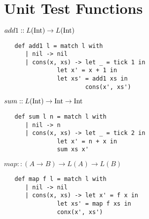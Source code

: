 \chapter{Unit Test Functions}

\(add1 :: L(\text{Int}) \to L(\text{Int})\)
\begin{verbatim}
   def add1 l = match l with 
      | nil -> nil
      | cons(x, xs) -> let _ = tick 1 in 
		       let x' = x + 1 in
		       let xs' = add1 xs in
                       cons(x', xs')
\end{verbatim}

\(sum :: L(\text{Int}) \to \text{Int} \to \text{Int} \)
\begin{verbatim}
   def sum l n = match l with 
      | nil -> n
      | cons(x, xs) -> let _ = tick 2 in 
		       let x' = n + x in
		       sum xs x'
\end{verbatim}

\(map :: (A \to B) \to L(A) \to L(B)\)
\begin{verbatim}
   def map f l = match l with
      | nil -> nil
      | cons(x, xs) -> let x' = f x in
		       let xs' = map f xs in
		       conx(x', xs')
\end{verbatim}

